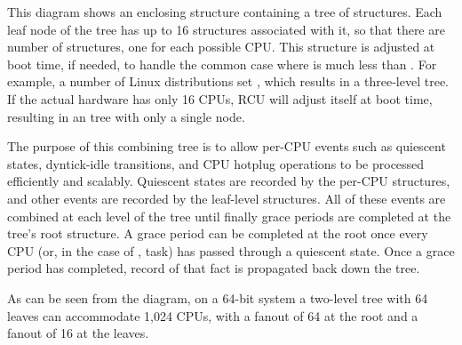 This diagram shows an enclosing  structure containing a tree
of  structures.
Each leaf node of the  tree has up
to 16  structures associated with it, so that there are
 number of  structures, one for each possible CPU\@.
This structure is adjusted at boot time, if needed, to handle the common
case where  is much less than .
For example, a number of Linux distributions set ,
which results in a three-level  tree.
If the actual hardware has only 16 CPUs, RCU will adjust itself
at boot time, resulting in an  tree with only a single node.

The purpose of this combining tree is to allow per-CPU events
such as quiescent states, dyntick-idle transitions,
and CPU hotplug operations to be processed efficiently
and scalably.
Quiescent states are recorded by the per-CPU  structures,
and other events are recorded by the leaf-level 
structures.
All of these events are combined at each level of the tree until finally
grace periods are completed at the tree's root 
structure.
A grace period can be completed at the root once every CPU
(or, in the case of , task)
has passed through a quiescent state.
Once a grace period has completed, record of that fact is propagated
back down the tree.

As can be seen from the diagram, on a 64-bit system
a two-level tree with 64 leaves can accommodate 1,024 CPUs, with a fanout
of 64 at the root and a fanout of 16 at the leaves.

\QuickQuizEnd

